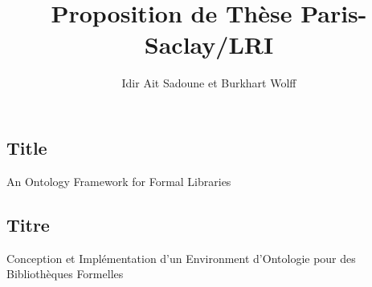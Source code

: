 \documentclass[a4paper,10pt]{article}
\begin{document}
\title{\textbf{Proposition de Thèse Paris-Saclay/LRI}}
\author{Idir Ait Sadoune et Burkhart Wolff}
\date{}

\maketitle

\begin{english}

\subsection*{Title}

\begin{center}
  \large An Ontology Framework for Formal Libraries
\end{center}

\end{english}

\subsection*{Titre}

\begin{center}
  \large Conception et Implémentation d'un Environment d'Ontologie
    pour des Bibliothèques Formelles
\end{center}
\end{document}
